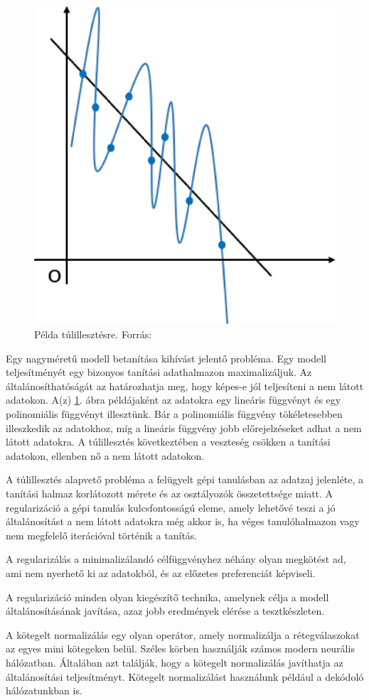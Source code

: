 \documentclass[12pt,a4]{article}
\begin{document}
        \begin{figure}[h]	
     		 \centering
     		 \includegraphics[width=0.5\linewidth]{overfitting.jpg}
     		 \caption{Példa túlillesztésre.
     			    Forrás:\cite{regularization-survey}}
                \label{fig:overfitting}
     	\end{figure}
        
        Egy nagyméretű modell betanítása kihívást jelentő probléma. Egy modell teljesítményét egy bizonyos tanítási adathalmazon maximalizáljuk. Az általánosíthatóságát az határozhatja meg, hogy képes-e jól teljesíteni a nem látott adatokon. A(z) \ref{fig:overfitting}. ábra példájaként az adatokra egy lineáris függvényt és egy polinomiális függvényt illesztünk. Bár a polinomiális függvény tökéletesebben illeszkedik az adatokhoz, míg a lineáris függvény jobb előrejelzéseket adhat a nem látott adatokra. A túlillesztés következtében a veszteség csökken a tanítási adatokon, ellenben nő a nem látott adatokon.

        A túlillesztés alapvető probléma a felügyelt gépi tanulásban az adatzaj jelenléte, a tanítási halmaz korlátozott mérete és az osztályozók összetettsége miatt. A regularizáció a gépi tanulás kulcsfontosságú eleme, amely lehetővé teszi a jó általánosítást a nem látott adatokra még akkor is, ha véges tanulóhalmazon vagy nem megfelelő iterációval történik a tanítás.

        A regularizálás a minimalizálandó célfüggvényhez néhány olyan megkötést ad, ami nem nyerhető ki az adatokból, és az előzetes preferenciát képviseli.

        A regularizáció minden olyan kiegészítő technika, amelynek célja a modell általánosításának javítása, azaz jobb eredmények elérése a tesztkészleten.

        A kötegelt normalizálás egy olyan operátor, amely normalizálja a rétegválaszokat az egyes mini kötegeken belül. Széles körben használják számos modern neurális hálózatban. Általában azt találják, hogy a kötegelt normalizálás javíthatja az általánosítási teljesítményt. Kötegelt normalizálást használunk például a dekódoló hálózatunkban is.
\end{document}
